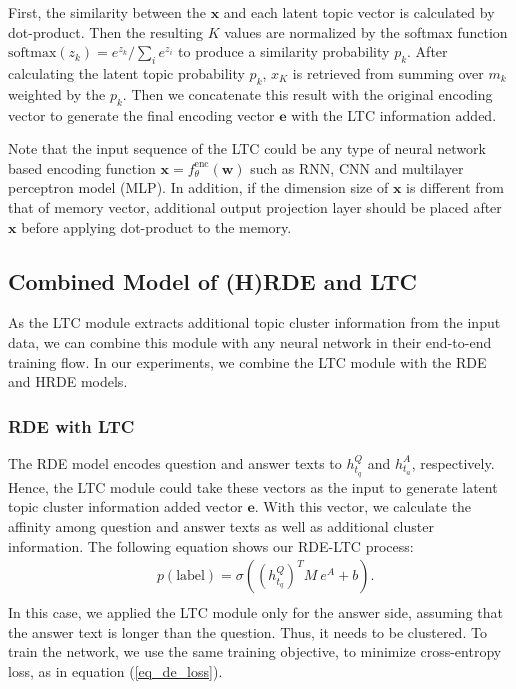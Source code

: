 \documentclass[11pt,a4paper]{article}
\begin{document}
First, the similarity between the $\boldsymbol{x}$ and each latent topic vector is calculated by dot-product.
Then the resulting $K$ values are  normalized by the softmax function $\text{softmax}(z_k)=e^{z_k}/ \sum_i e^{z_i}$ to produce a similarity probability $p_k$.
After calculating the latent topic probability $p_k$, $x_K$ is retrieved from summing over $m_k$ weighted by the $p_k$. Then we concatenate this result with the original encoding vector to generate the final encoding vector 
$\boldsymbol{e}$ with the LTC information added.

Note that the input sequence of the LTC could be any type of neural network based encoding function $\boldsymbol{x}=f^{\text{enc}}_\theta(\boldsymbol{w})$ such as RNN, CNN and multilayer perceptron model (MLP).
In addition, if the dimension size of $\boldsymbol{x}$ is different from that of memory vector, additional output projection layer should be placed after $\boldsymbol{x}$ before applying dot-product to the memory.


\subsection{Combined Model of (H)RDE and LTC}
As the LTC module extracts additional topic cluster information from the input data, we can combine this module with any neural network in their end-to-end training flow. In our experiments, we combine the LTC module with the RDE and HRDE models. 


\subsubsection{RDE with LTC}
The RDE model encodes question and answer texts to $h_{t_q}^Q$ and $h_{t_a}^A$, respectively. Hence, the LTC module could take these vectors as the input to generate latent topic cluster information added vector $\boldsymbol{e}$. 
With this vector, we calculate the affinity among question and answer texts as well as additional cluster information.
The following equation shows our RDE-LTC process:
\begin{equation}
\begin{aligned}
& p(\text{label}) = \sigma ( ({h_{t_q}^Q})^T M~e^A + b ). \\
\end{aligned}
\label{eq_rde_ltc}
\end{equation}
In this case, we applied the LTC module only for the answer side, assuming that the answer text is longer than the question. Thus, it needs to be clustered. 
To train the network, we use the same training objective, to minimize cross-entropy loss, as in equation (\ref{eq_de_loss}).
\end{document}
